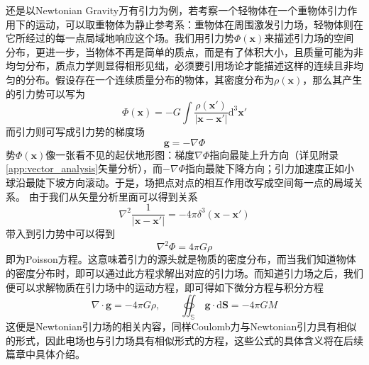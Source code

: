 \documentclass[b5paper]{book}
\begin{document}
还是以Newtonian Gravity万有引力为例，若考察一个轻物体在一个重物体引力作用下的运动，可以取重物体为静止参考系：重物体在周围激发引力场，轻物体则在它所经过的每一点局域地响应这个场。我们用引力势$\Phi(\boldsymbol x)$来描述引力场的空间分布，更进一步，当物体不再是简单的质点，而是有了体积大小，且质量可能为非均匀分布，质点力学则显得相形见绌，必须要引用场论才能描述这样的连续且非均匀的分布。假设存在一个连续质量分布的物体，其密度分布为$\rho(\boldsymbol{x})$，那么其产生的引力势可以写为
\begin{equation}
    \Phi(\boldsymbol{x}) = -G\int\frac{\rho(\boldsymbol{x}')}{|\boldsymbol{x}-\boldsymbol{x}'|}\mathrm{d}^3\boldsymbol{x}'
\end{equation}
而引力则可写成引力势的梯度场
\begin{equation}
    \boldsymbol g = -\nabla \Phi
\end{equation}
势$\Phi(\boldsymbol{x})$像一张看不见的起伏地形图：梯度$\nabla\Phi$指向最陡上升方向（详见附录\ref{app:vector_analysis}矢量分析），而$-\nabla\Phi$指向最陡下降方向；引力加速度正如小球沿最陡下坡方向滚动。于是，场把点对点的相互作用改写成空间每一点的局域关系。
由于我们从矢量分析里面可以得到关系
\begin{equation}
    \nabla^2\frac{1}{|\boldsymbol{x}-\boldsymbol{x}'|} = -4\pi\delta^3(\boldsymbol{x}-\boldsymbol{x}')
\end{equation}
带入到引力势中可以得到
\begin{equation}
    \nabla^2\Phi = 4\pi G\rho
\end{equation}
即为Poisson方程。这意味着引力的源头就是物质的密度分布，而当我们知道物体的密度分布时，即可以通过此方程求解出对应的引力场。而知道引力场之后，我们便可以求解物质在引力场中的运动方程，即可得如下微分方程与积分方程
\begin{equation}
    \nabla\cdot \boldsymbol{g} = -4\pi G \rho,\qquad \oiint_\mathbb{S} ~\boldsymbol{g}\cdot\mathrm{d}\boldsymbol{S} = -4\pi G M
\end{equation}
这便是Newtonian引力场的相关内容，同样Coulomb力与Newtonian引力具有相似的形式，因此电场也与引力场具有相似形式的方程，这些公式的具体含义将在后续篇章中具体介绍。
\end{document}
